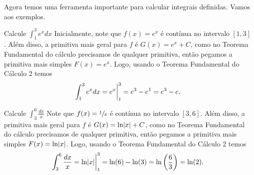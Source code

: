 Agora temos uma ferramenta importante para calcular integrais definidas.
Vamos aos exemplos.
\begin{example}
  Calcule \(\int_1^3 e^x dx\)
  \solution
  Inicialmente, note que $f(x)=e^x$ é contínua no intervalo $[1, 3]$. Além
  disso, a primitiva mais geral para $f$ é $G(x)=e^x+ C$, como no Teorema
  Fundamental do cálculo precisamos de qualquer primitiva, então pegamos a
  primitiva mais simples $F(x)=e^x$. Logo, usando o Teorema Fundamental do
  Cálculo 2 temos
  \[
    \int_1^3 e^x dx
    = e^x \bigg\rvert_{1}^{3}
    = e^3-e^1
    = e^3 - e.
  \]
\end{example}

\begin{example}
  Calcule \(\int_3^6 \frac{dx}{x}\)
  \solution
  Note que $f(x)=\sfrac{1}{x}$ é contínua no intervalo $[3, 6]$. Além disso, a
  primitiva mais geral para $f$ é $G(x)=\ln\abs{x}+ C$, como no Teorema Fundamental
  do cálculo precisamos de qualquer primitiva, então pegamos a primitiva mais
  simples $F(x)=\ln\abs{x}$. Logo, usando o Teorema Fundamental do Cálculo 2 temos
  \[
    \int_3^6 \frac{dx}{x}
    = \ln\abs{x} \evalat{1}{3}
    = \ln(6) - \ln(3)
    = \ln\left(\frac{6}{3}\right)
    = \ln(2).
  \]
\end{example}

